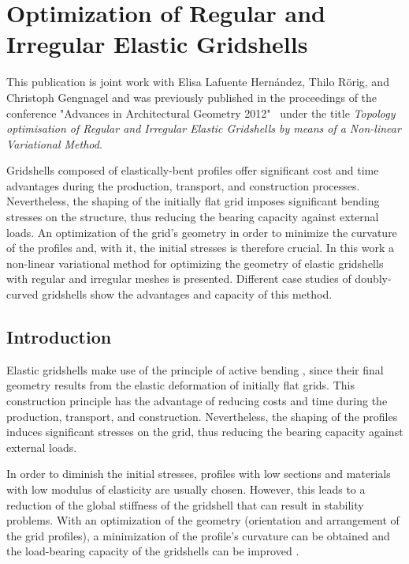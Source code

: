 \documentclass[Thesis.tex]{subfiles}
\begin{document}
\chapter{Optimization of Regular and Irregular Elastic Gridshells}
\label{chp:gridshells}

This publication is joint work with Elisa Lafuente Hern\'andez, Thilo R\"orig, and Christoph Gengnagel and was
previously published in the proceedings of the conference "Advances in Architectural Geometry 2012"~\cite{Lafuente2012} under the title \emph{Topology optimisation of Regular and Irregular Elastic Gridshells by means of a Non-linear Variational Method}.

Gridshells composed of elastically-bent profiles offer significant cost and time advantages during the production, transport, and construction processes. Nevertheless, the shaping of the initially flat grid imposes significant bending stresses on the structure, thus reducing the bearing capacity against external loads. An optimization of the grid's geometry in order to minimize the curvature of the profiles and, with it, the initial stresses is therefore crucial. In this work a non-linear variational method for optimizing the geometry of elastic gridshells with regular and irregular meshes is presented. Different case studies of doubly-curved gridshells show the advantages and capacity of this method.

\section{Introduction}

Elastic gridshells make use of the principle of active bending \cite{AlpermannLG2012}, since their final geometry results from the elastic deformation of initially flat grids. This construction principle has the advantage of reducing costs and time during the production, transport, and construction. Nevertheless, the shaping of the profiles induces significant stresses on the grid, thus reducing the bearing capacity against external loads.

In order to diminish the initial stresses, profiles with low sections and materials with low modulus of elasticity are usually chosen. However, this leads to a reduction of the global stiffness of the gridshell that can result in stability problems. With an optimization of the geometry (orientation and arrangement of the grid profiles), a minimization of the profile's curvature can be obtained and the load-bearing capacity of the gridshells can be improved \cite{Lafuente2011}.
\end{document}
